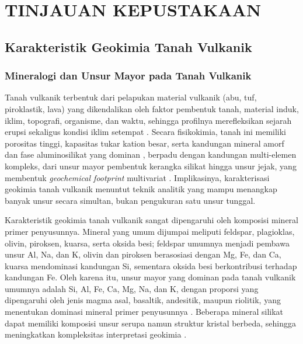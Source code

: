 
\chapter{TINJAUAN KEPUSTAKAAN}

\section{Karakteristik Geokimia Tanah Vulkanik}

\subsection{Mineralogi dan Unsur Mayor pada Tanah Vulkanik}

Tanah vulkanik terbentuk dari pelapukan material vulkanik (abu, tuf, piroklastik, lava) yang dikendalikan oleh faktor pembentuk tanah, material induk, iklim, topografi, organisme, dan waktu, sehingga profilnya merefleksikan sejarah erupsi sekaligus kondisi iklim setempat \citep{certini_crucial_2022}. Secara fisikokimia, tanah ini memiliki porositas tinggi, kapasitas tukar kation besar, serta kandungan mineral amorf dan fase aluminosilikat yang dominan \citep{nanzyo_unique_2003}, berpadu dengan kandungan multi-elemen kompleks, dari unsur mayor pembentuk kerangka silikat hingga unsur jejak, yang membentuk \textit{geochemical footprint} multivariat \citep{harmon_laser-induced_2019, khumaeni_analysis_2025}. Implikasinya, karakterisasi geokimia tanah vulkanik menuntut teknik analitik yang mampu menangkap banyak unsur secara simultan, bukan pengukuran satu unsur tunggal.

Karakteristik geokimia tanah vulkanik sangat dipengaruhi oleh komposisi mineral primer penyusunnya. Mineral yang umum dijumpai meliputi feldspar, plagioklas, olivin, piroksen, kuarsa, serta oksida besi; feldspar umumnya menjadi pembawa unsur Al, Na, dan K, olivin dan piroksen berasosiasi dengan Mg, Fe, dan Ca, kuarsa mendominasi kandungan Si, sementara oksida besi berkontribusi terhadap kandungan Fe. Oleh karena itu, unsur mayor yang dominan pada tanah vulkanik umumnya adalah Si, Al, Fe, Ca, Mg, Na, dan K, dengan proporsi yang dipengaruhi oleh jenis magma asal, basaltik, andesitik, maupun riolitik, yang menentukan dominasi mineral primer penyusunnya \citep{khumaeni_analysis_2025}. Beberapa mineral silikat dapat memiliki komposisi unsur serupa namun struktur kristal berbeda, sehingga meningkatkan kompleksitas interpretasi geokimia \citep{fabre_advances_2020}.

